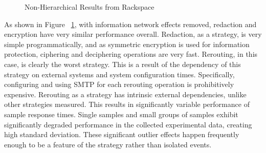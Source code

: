 \begin{figure}[htbp]
\begin{minipage}[b]{0.5\linewidth}
\centering
{}
\end{minipage}
\begin{minipage}[b]{0.5\linewidth}
\centering
{}
\end{minipage}
\caption{Non-Hierarchical Results from Rackspace}
\label{fig:model:single-node-results}
\end{figure}

As shown in Figure ~\ref{fig:model:single-node-results}, with information network effects removed, redaction and encryption have very similar performance overall.  Redaction, as a strategy, is very simple programmatically, and as symmetric encryption is used for information protection, ciphering and deciphering operations are very fast.  Rerouting, in this case, is clearly the worst strategy.  This is a result of the dependency of this strategy on external systems and system configuration times.  Specifically, configuring and using SMTP for each rerouting operation is prohibitively expensive.  Rerouting as a strategy has intrinsic external dependencies, unlike other strategies measured.  This results in significantly variable performance of sample response times.  Single samples and small groups of samples exhibit significantly degraded performance in the collected experimental data, creating high standard deviation.  These significant outlier effects happen frequently enough to be a feature of the strategy rather than isolated events.